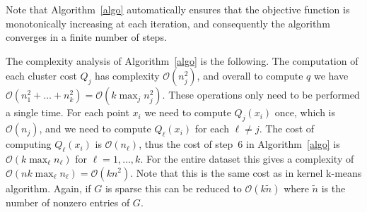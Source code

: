 \documentclass[10pt,journal,compsoc]{IEEEtran}
\newcommand\OO{{\mathcal{O}}}
\begin{document}
Note that Algorithm~\ref{algo} automatically ensures that the 
objective function is
monotonically increasing at each iteration, and consequently the algorithm
converges in a finite number of steps.

The complexity analysis of Algorithm~\ref{algo} is the following.
The computation of each cluster cost
$Q_j$ has complexity $\OO(n_j^2)$, and overall to compute $q$
we have $\OO(n_1^2+\dots + n_k^2) = \OO(k \max_j n_j^2)$. 
These operations only need to be performed a single time. For
each point $x_i$ we need to compute $Q_j(x_i)$ once, which is
$\OO(n_j)$, and we need to compute $Q_\ell(x_i)$ for each $\ell\ne j$. 
The cost of computing 
$Q_\ell(x_i)$
is $\OO(n_\ell)$, thus the cost of step~$6$ in
Algorithm~\ref{algo} is $\OO(k \max_\ell n_\ell)$ for $\ell=1,\dotsc,k$.
For the 
entire dataset this gives a complexity
of $\OO(n k  \max_\ell n_\ell) =\OO(k n^2)$. Note that this is the same cost as
in kernel k-means algorithm. 
Again, if $G$ is sparse
this can be reduced to $\OO(k \tilde{n})$ where $\tilde{n}$ 
is the number of nonzero
entries of $G$.
\end{document}
